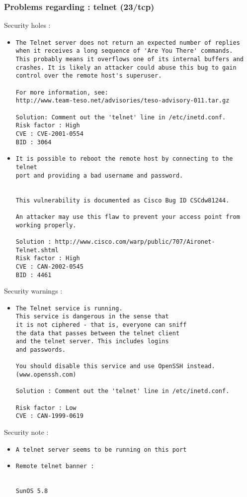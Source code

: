 \documentclass{article}
\begin{document}
\subsubsection{Problems regarding : telnet (23/tcp)}
Security holes :\\
\begin{itemize}
\item \begin{verbatim}
The Telnet server does not return an expected number of replies
when it receives a long sequence of 'Are You There' commands.
This probably means it overflows one of its internal buffers and
crashes. It is likely an attacker could abuse this bug to gain
control over the remote host's superuser.

For more information, see:
http://www.team-teso.net/advisories/teso-advisory-011.tar.gz

Solution: Comment out the 'telnet' line in /etc/inetd.conf.
Risk factor : High
CVE : CVE-2001-0554
BID : 3064
\end{verbatim}\item \begin{verbatim}
It is possible to reboot the remote host by connecting to the telnet
port and providing a bad username and password.
 

This vulnerability is documented as Cisco Bug ID CSCdw81244.

An attacker may use this flaw to prevent your access point from
working properly.

Solution : http://www.cisco.com/warp/public/707/Aironet-Telnet.shtml
Risk factor : High
CVE : CAN-2002-0545
BID : 4461
\end{verbatim}\end{itemize}
Security warnings :\\
\begin{itemize}
\item \begin{verbatim}
The Telnet service is running.
This service is dangerous in the sense that
it is not ciphered - that is, everyone can sniff
the data that passes between the telnet client
and the telnet server. This includes logins
and passwords.

You should disable this service and use OpenSSH instead.
(www.openssh.com)

Solution : Comment out the 'telnet' line in /etc/inetd.conf.

Risk factor : Low
CVE : CAN-1999-0619
\end{verbatim}\end{itemize}
Security note :\\
\begin{itemize}
\item \begin{verbatim}
A telnet server seems to be running on this port
\end{verbatim}\item \begin{verbatim}
Remote telnet banner :


SunOS 5.8

\end{verbatim}\end{itemize}
\end{document}
